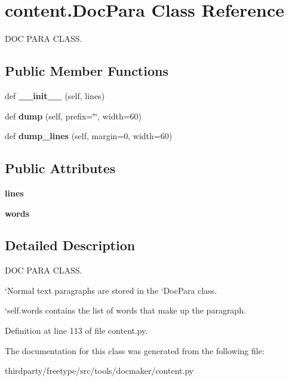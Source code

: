 \hypertarget{classcontent_1_1_doc_para}{}\section{content.\+Doc\+Para Class Reference}
\label{classcontent_1_1_doc_para}


D\+OC P\+A\+RA C\+L\+A\+SS.  


\subsection*{Public Member Functions}
\begin{DoxyCompactItemize}
\item 
\mbox{\label{classcontent_1_1_doc_para_a66d2e5801f561056bc1c52c975efd6d8}} 
def {\bfseries \+\_\+\+\_\+init\+\_\+\+\_\+} (self, lines)
\item 
\mbox{\label{classcontent_1_1_doc_para_aaf0b78eb406c88f9d2639055071284c4}} 
def {\bfseries dump} (self, prefix=\char`\"{}\char`\"{}, width=60)
\item 
\mbox{\label{classcontent_1_1_doc_para_a22cc63477a2c820ec82d7f5009d50ba0}} 
def {\bfseries dump\+\_\+lines} (self, margin=0, width=60)
\end{DoxyCompactItemize}
\subsection*{Public Attributes}
\begin{DoxyCompactItemize}
\item 
\mbox{\label{classcontent_1_1_doc_para_aeba7e738c3e6d07306c9d2493e90b86c}} 
{\bfseries lines}
\item 
\mbox{\label{classcontent_1_1_doc_para_a0e61aa41cce302051b93b0f9af9665ef}} 
{\bfseries words}
\end{DoxyCompactItemize}


\subsection{Detailed Description}
D\+OC P\+A\+RA C\+L\+A\+SS. 

`\+Normal\textquotesingle{} text paragraphs are stored in the `\+Doc\+Para\textquotesingle{} class.

`self.words\textquotesingle{} contains the list of words that make up the paragraph. 

Definition at line 113 of file content.\+py.



The documentation for this class was generated from the following file\+:\begin{DoxyCompactItemize}
\item 
thirdparty/freetype/src/tools/docmaker/content.\+py\end{DoxyCompactItemize}
